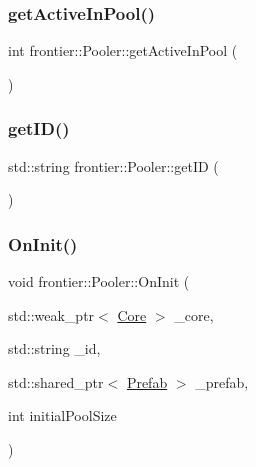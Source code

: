 \mbox{\label{classfrontier_1_1_pooler_a7b4e2884404c3c939b0d6feccade6a70}} 
\subsubsection{\texorpdfstring{get\+Active\+In\+Pool()}{getActiveInPool()}}
{\footnotesize\ttfamily int frontier\+::\+Pooler\+::get\+Active\+In\+Pool (\begin{DoxyParamCaption}{ }\end{DoxyParamCaption})}

\mbox{\label{classfrontier_1_1_pooler_a5fb9072149f17191cdf585a4200561a9}} 
\subsubsection{\texorpdfstring{get\+I\+D()}{getID()}}
{\footnotesize\ttfamily std\+::string frontier\+::\+Pooler\+::get\+ID (\begin{DoxyParamCaption}{ }\end{DoxyParamCaption})}

\mbox{\label{classfrontier_1_1_pooler_ad62089e85f54e4cfa198f1f796e2bfea}} 
\subsubsection{\texorpdfstring{On\+Init()}{OnInit()}}
{\footnotesize\ttfamily void frontier\+::\+Pooler\+::\+On\+Init (\begin{DoxyParamCaption}\item[{std\+::weak\+\_\+ptr$<$ \hyperlink{classfrontier_1_1_core}{Core} $>$}]{\+\_\+core,  }\item[{std\+::string}]{\+\_\+id,  }\item[{std\+::shared\+\_\+ptr$<$ \hyperlink{classfrontier_1_1_prefab}{Prefab} $>$}]{\+\_\+prefab,  }\item[{int}]{initial\+Pool\+Size }\end{DoxyParamCaption})}

